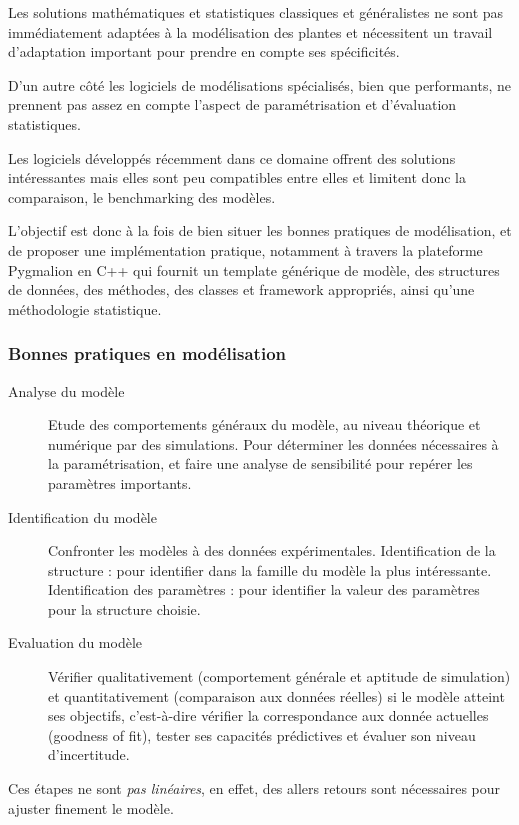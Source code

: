 Les solutions mathématiques et statistiques classiques et généralistes ne sont pas immédiatement adaptées à la modélisation des plantes et nécessitent un travail d’adaptation important pour prendre en compte ses spécificités.

D’un autre côté les logiciels de modélisations spécialisés, bien que performants, ne prennent pas assez en compte l’aspect de paramétrisation et d'évaluation statistiques.

Les logiciels développés récemment dans ce domaine offrent des solutions intéressantes mais elles sont peu compatibles entre elles et limitent donc la comparaison, le benchmarking des modèles.

L’objectif est donc à la fois de bien situer les bonnes pratiques de modélisation, et de proposer une implémentation pratique, notamment à travers la plateforme Pygmalion en C++ qui fournit un template générique de modèle, des structures de données, des méthodes, des classes et framework appropriés, ainsi qu’une méthodologie statistique.

\subsubsection{Bonnes pratiques en modélisation}

\begin{description}

\item[Analyse du modèle] Etude des comportements généraux du modèle, au niveau théorique et numérique par des simulations. Pour déterminer les données nécessaires à la paramétrisation, et faire une analyse de sensibilité pour repérer les paramètres importants.
\item[Identification du modèle] Confronter les modèles à des données expérimentales. Identification de la structure : pour identifier dans la famille du modèle la plus intéressante. Identification des paramètres : pour identifier la valeur des paramètres pour la structure choisie.
\item[Evaluation du modèle] Vérifier qualitativement (comportement générale et aptitude de simulation) et quantitativement (comparaison aux données réelles) si le modèle atteint ses objectifs, c’est-à-dire vérifier la correspondance aux donnée actuelles (goodness of fit), tester ses capacités prédictives et évaluer son niveau d’incertitude.

\end{description}

Ces étapes ne sont \emph{pas linéaires}, en effet, des allers retours sont nécessaires pour ajuster finement le modèle.

